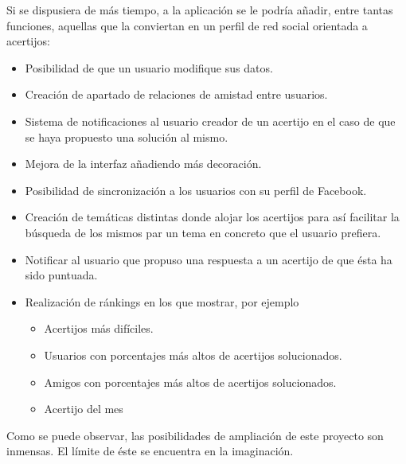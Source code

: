 Si se dispusiera de más tiempo, a la aplicación se le podría añadir, entre tantas funciones, aquellas que la conviertan en un perfil de red social orientada a acertijos:

\begin{itemize}
    \item Posibilidad de que un usuario modifique sus datos.
    \item Creación de apartado de relaciones de amistad entre usuarios.
    \item Sistema de notificaciones al usuario creador de un acertijo en el caso de que se haya propuesto una solución al mismo.
    \item Mejora de la interfaz añadiendo más decoración.
    \item Posibilidad de sincronización a los usuarios con su perfil de Facebook.
    \item Creación de temáticas distintas donde alojar los acertijos para así facilitar la búsqueda de los mismos par un tema en concreto que el usuario prefiera.
    \item Notificar al usuario que propuso una respuesta a un acertijo de que ésta ha sido puntuada.
    \item Realización de ránkings en los que mostrar, por ejemplo 
        \begin{itemize}
            \item Acertijos más difíciles.
            \item Usuarios con porcentajes más altos de acertijos solucionados.
            \item Amigos con porcentajes más altos de acertijos solucionados.
            \item Acertijo del mes
        \end{itemize}
\end{itemize}

Como se puede observar, las posibilidades de ampliación de este proyecto son inmensas. El límite de éste se encuentra en la imaginación.